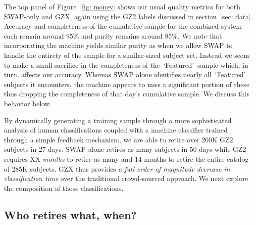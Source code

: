 \documentclass[twocolumn]{aastex6}
\newcommand{\feat}{`Featured'}
\begin{document}
The top panel of Figure~\ref{fig: money} shows our usual quality metrics for both 
SWAP-only and GZX, again using the GZ2 labels discussed in section~\ref{sec: data}.
Accuracy and completeness of the cumulative sample for the combined system 
each remain around 95\% and purity remains around 85\%. We note that 
incorporating the machine yields similar purity as when we 
allow SWAP to handle the entirety of the sample for a similar-sized subject set. 
Instead we seem to make a small sacrifice in the completeness of the~\feat~sample
which, in turn, affects our accuracy. Whereas SWAP alone identifies nearly all~\feat~
subjects it encounters,  the machine appears to miss a significant 
portion of these thus dropping the completeness of that day's 
cumulative sample. We discuss this behavior below.

By dynamically generating a training sample
through a more sophisticated analysis of human classifications coupled with a 
machine classifier trained through a simple feedback mechanism, we are able to 
retire over 200K GZ2 subjects in 27 days.  SWAP alone retires as many subjects in 50 days
while GZ2 requires XX \textit{months} to retire as many and 14 months to retire 
the entire catalog of 285K subjects. 
GZX thus provides \textit{a full order of magnitude decrease in classification time} 
over the traditional crowd-sourced approach. 
We next explore the composition of those classifications.


\subsection{Who retires what, when?}  
\end{document}
